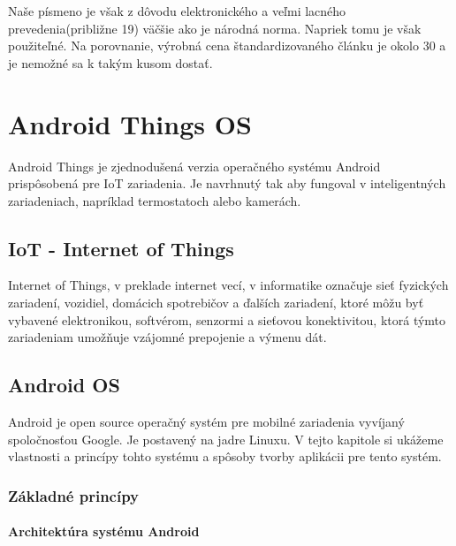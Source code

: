 \documentclass{template/socthesis}
\begin{document}
Naše písmeno je však z dôvodu elektronického a veľmi lacného prevedenia(približne 19) väčšie ako je národná norma. Napriek tomu je však použiteľné. Na porovnanie, výrobná cena štandardizovaného článku je okolo 30 a je nemožné sa k takým kusom dostať.
\newpage
\chapter{Android Things OS}
Android Things je zjednodušená verzia operačného systému Android prispôsobená pre IoT zariadenia. Je navrhnutý tak aby fungoval v inteligentných zariadeniach, napríklad termostatoch alebo kamerách.

\section{IoT - Internet of Things}
Internet of Things, v preklade internet vecí, v informatike označuje sieť fyzických zariadení, vozidiel, domácich spotrebičov a ďalších zariadení, ktoré môžu byť vybavené elektronikou, softvérom, senzormi a sieťovou konektivitou, ktorá týmto zariadeniam umožňuje vzájomné prepojenie a výmenu dát. \cite{karimi2013internet}
\section{Android OS}
Android je open source operačný systém pre mobilné zariadenia vyvíjaný spoločnosťou Google. Je postavený na jadre Linuxu. V tejto kapitole si ukážeme vlastnosti  a princípy tohto systému a spôsoby tvorby aplikácii pre tento systém.

\subsection{Základné princípy}
\subsubsection{Architektúra systému Android}
\end{document}
